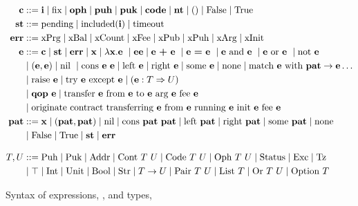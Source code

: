 \documentclass[runningheads]{llncs}
\begin{document}
\begin{figure}[tp]
\begin{align*}
  \CONSTANT & ::= \INT \mid \FIX
              \mid \OPH \mid \PUH \mid\PUK \mid \CODE \mid
              \NTEZ \mid \SUNIT \mid \FALSE \mid \TRUE \\
  \STATUS & ::= \STATUSPENDING \mid \STATUSINCLUDING (\INT) \mid
            \STATUSTIMEOUT \\
  \ERROR &::= \ERRPRG \mid \ERRBAL \mid \ERRCOUNT \mid \ERRFEE \mid
           \ERRPUK \mid \ERRPUH \mid \ERRARG \mid \ERRINIT\\
	\EXPR & :: =  \CONSTANT \mid \STATUS \mid \ERROR \mid \VARIABLE \mid \lambda \VARIABLE. \EXPR\ 
	\mid \EXPR\EXPR  %
  \mid \EXPR\ \PLUS\ \EXPR\ \mid
  \EXPR\ \EQUAL\ \EXPR\
  \mid \EXPR\ \AND\ \EXPR\ \mid \EXPR\ \OR\ \EXPR\ \mid \NOT\ \EXPR
  \\& \mid (\EXPR,\EXPR)\mid \NIL\ \mid \CONS\ \EXPR\ \EXPR \mid \LEFT\ \EXPR \mid\RIGHT\
  \EXPR \mid \SOME\ \EXPR \mid \NONE
  \mid \MATCH\ \EXPR\ \WITH\ \PATTERN\to\EXPR \dots 
  \\& \mid \RAISE\ \EXPR \mid \TRY\ \EXPR\ \EXCEPT\ \EXPR \mid \CAST\EXPR\TYPE\TYPEU
  \\& \mid \QOP\  \EXPR \mid \TRANSFER[\EXPR]\EXPR\EXPR\EXPR\EXPR
  \\& \mid \ORIGINATE\EXPR\EXPR\EXPR\EXPR\EXPR
  \\
  \PATTERN &::= \VARIABLE \mid (\PATTERN, \PATTERN) \mid \NIL \mid \CONS\ \PATTERN\ \PATTERN \mid \LEFT\ \PATTERN \mid\RIGHT\
             \PATTERN \mid \SOME\ \PATTERN \mid \NONE \\
            &\mid \FALSE \mid \TRUE \mid \STATUS \mid \ERROR
  \\[2ex]
  \TYPE, \TYPEU & ::=
                  \TPUH \mid
                  \TPUK \mid
                  \TADDR \mid 
                  \TCONTRACT\ \TYPE\ \TYPEU \mid
                  \TCODE\ \TYPE\ \TYPEU \mid
                  \TOPH\ \TYPE\ \TYPEU \mid
                  \TSTATUS \mid \TEXCEPTION \mid \TTEZ \\
  & \mid \TNO \mid \TINT \mid \TUNIT \mid \TBOOL \mid \TSTRING \mid \TYPE\to\TYPEU \mid \TPAIR\ \TYPE\ \TYPEU \mid \TLIST\ \TYPE
    \mid \TSUM\ \TYPE\ \TYPEU \mid \TOPTION\ \TYPE 
\end{align*}
  \caption{Syntax of expressions, \EXPR, and types, \TYPE}
  \label{fig:syntax-expressions}
\end{figure}
\end{document}
